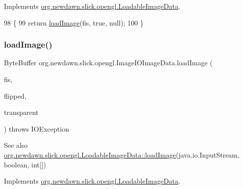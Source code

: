 Implements \mbox{\hyperlink{interfaceorg_1_1newdawn_1_1slick_1_1opengl_1_1_loadable_image_data_a640021b955dde7deeeeabb5ac3738d2b}{org.\+newdawn.\+slick.\+opengl.\+Loadable\+Image\+Data}}.


\begin{DoxyCode}
98                                                                     \{
99         \textcolor{keywordflow}{return} \mbox{\hyperlink{classorg_1_1newdawn_1_1slick_1_1opengl_1_1_image_i_o_image_data_aa524a7c6717557a6ac60d1ac8b413950}{loadImage}}(fis, \textcolor{keyword}{true}, null);
100     \}
\end{DoxyCode}
\mbox{\label{classorg_1_1newdawn_1_1slick_1_1opengl_1_1_image_i_o_image_data_adfea90f9552b2fc504f28d0de7712ce1}} 
\subsubsection{\texorpdfstring{load\+Image()}{loadImage()}\hspace{0.1cm}{\footnotesize\ttfamily [2/3]}}
{\footnotesize\ttfamily Byte\+Buffer org.\+newdawn.\+slick.\+opengl.\+Image\+I\+O\+Image\+Data.\+load\+Image (\begin{DoxyParamCaption}\item[{Input\+Stream}]{fis,  }\item[{boolean}]{flipped,  }\item[{int \mbox{[}$\,$\mbox{]}}]{transparent }\end{DoxyParamCaption}) throws I\+O\+Exception\hspace{0.3cm}{\ttfamily [inline]}}

\begin{DoxySeeAlso}{See also}
\mbox{\hyperlink{interfaceorg_1_1newdawn_1_1slick_1_1opengl_1_1_loadable_image_data_a640021b955dde7deeeeabb5ac3738d2b}{org.\+newdawn.\+slick.\+opengl.\+Loadable\+Image\+Data\+::load\+Image}}(java.\+io.\+Input\+Stream, boolean, int\mbox{[}\mbox{]}) 
\end{DoxySeeAlso}


Implements \mbox{\hyperlink{interfaceorg_1_1newdawn_1_1slick_1_1opengl_1_1_loadable_image_data_a448a235d1058316349f513a69f593d9b}{org.\+newdawn.\+slick.\+opengl.\+Loadable\+Image\+Data}}.


